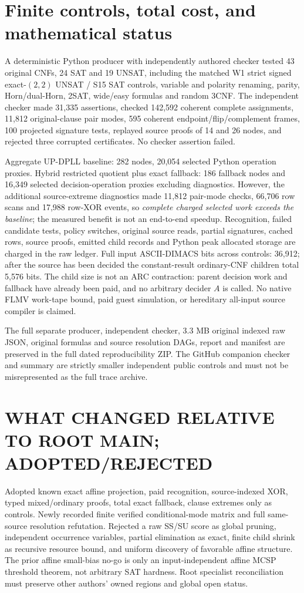 \documentclass[11pt]{article}
\begin{document}
\section{Finite controls, total cost, and mathematical status}
A deterministic Python producer with independently authored checker tested 43 original CNFs, 24 SAT and 19 UNSAT, including the matched W1 strict signed exact-$(2,2)$ UNSAT / S15 SAT controls, variable and polarity renaming, parity, Horn/dual-Horn, 2SAT, wide/easy formulas and random 3CNF. The independent checker made 31,335 assertions, checked 142,592 coherent complete assignments, 11,812 original-clause pair modes, 595 coherent endpoint/flip/complement frames, 100 projected signature tests, replayed source proofs of 14 and 26 nodes, and rejected three corrupted certificates. No checker assertion failed.
\par
Aggregate UP-DPLL baseline: 282 nodes, 20,054 selected Python operation proxies. Hybrid restricted quotient plus exact fallback: 186 fallback nodes and 16,349 selected decision-operation proxies excluding diagnostics. However, the additional source-extreme diagnostics made 11,812 pair-mode checks, 66,706 row scans and 17,988 row-XOR events, so \emph{complete charged selected work exceeds the baseline}; the measured benefit is not an end-to-end speedup. Recognition, failed candidate tests, policy switches, original source reads, partial signatures, cached rows, source proofs, emitted child records and Python peak allocated storage are charged in the raw ledger. Full input ASCII-DIMACS bits across controls: 36,912; after the source has been decided the constant-result ordinary-CNF children total 5,576 bits. The child size is not an ARC contraction: parent decision work and fallback have already been paid, and no arbitrary decider $A$ is called. No native FLMV work-tape bound, paid guest simulation, or hereditary all-input source compiler is claimed.
\par
The full separate producer, independent checker, 3.3 MB original indexed raw JSON, original formulas and source resolution DAGs, report and manifest are preserved in the full dated reproducibility ZIP. The GitHub companion checker and summary are strictly smaller independent public controls and must not be misrepresented as the full trace archive.

\section{WHAT CHANGED RELATIVE TO ROOT MAIN; ADOPTED/REJECTED}
Adopted known exact affine projection, paid recognition, source-indexed XOR, typed mixed/ordinary proofs, total exact fallback, clause extremes only as controls. Newly recorded finite verified conditional-mode matrix and full same-source resolution refutation. Rejected a raw SS/SU score as global pruning, independent occurrence variables, partial elimination as exact, finite child shrink as recursive resource bound, and uniform discovery of favorable affine structure. The prior affine small-bias no-go is only an input-independent affine MCSP threshold theorem, not arbitrary SAT hardness. Root specialist reconciliation must preserve other authors' owned regions and global open status.
\end{document}
